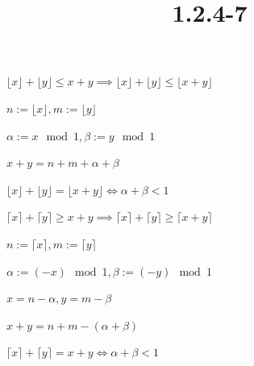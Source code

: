 \documentclass{article}
\title{1.2.4-7}
\begin{document}
\maketitle

$\lfloor x \rfloor + \lfloor y \rfloor \leq x + y \implies \lfloor x \rfloor + \lfloor y \rfloor \leq \lfloor x + y \rfloor$

$n := \lfloor x \rfloor, m := \lfloor y \rfloor$

$\alpha := x \mod 1, \beta := y \mod 1$

$x + y = n + m + \alpha + \beta$

$\lfloor x \rfloor + \lfloor y \rfloor = \lfloor x + y \rfloor \iff \alpha + \beta < 1$

$\lceil x \rceil + \lceil y \rceil \geq x + y \implies \lceil x \rceil + \lceil y \rceil \geq \lceil x + y \rceil$

$n := \lceil x \rceil, m := \lceil y \rceil$

$\alpha := (-x) \mod 1, \beta := (-y) \mod 1$

$x = n - \alpha, y = m - \beta$

$x + y = n + m - (\alpha + \beta)$

$\lceil x \rceil + \lceil y \rceil = x + y \iff \alpha + \beta < 1$
\end{document}
